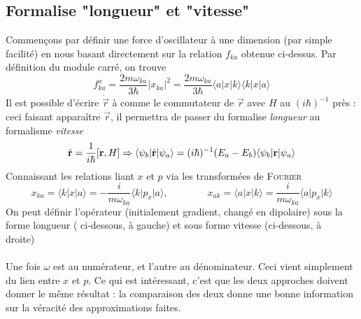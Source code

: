 \subsection{Formalise "longueur" et "vitesse"}
Commençons par définir une force d'oscillateur à une dimension (par simple facilité) en nous 
basant directement sur la relation $f_{ka}$ obtenue ci-dessus. Par définition du module carré, 
on trouve
\begin{equation}
f_{ka}^x =  \frac{2 m \omega_{ka}}{3 \hbar} \vert x_{ka} \vert^2 =
\frac{2m \omega_{ka}}{3 \hbar} \langle a \vert x \vert k \rangle 
\langle k \vert x \vert a \rangle
\end{equation}
Il est possible d'écrire $\dot{\vec{r}}$ à comme le commutateur de $\vec{r}$ avec $H$ au $(i\hbar)^{
-1}$ près : ceci faisant apparaître $\vec{r}$, il permettra de passer du formalise \textit{longueur}
au formalisme \textit{vitesse}
\begin{equation}
\dot{{\bf r}} = \frac{1}{i \hbar} [ {\bf r}, H] \Rightarrow
\langle \psi_b \vert \dot{{\bf r}} \vert \psi_a \rangle
= (i \hbar)^{-1} (E_a - E_b) \langle \psi_b \vert {\bf r} \vert
\psi_a \rangle
\end{equation}
Connaissant les relations liant $x$ et $p$ via les transformées de \textsc{Fourier}
\begin{equation}
x_{ka} = \langle k \vert x \vert a \rangle = - \frac{i}{m \omega_{ka}}
 \langle k \vert  p_x \vert a \rangle,\qquad\qquad
 x_{ak} = \langle a \vert x \vert k \rangle =  \frac{i}{m \omega_{ka}}
 \langle a \vert  p_x \vert k \rangle 
\end{equation}
On peut définir l'opérateur (initialement gradient, changé en dipolaire) sous la forme longueur (
ci-dessous, à gauche) et sous forme vitesse (ci-dessous, à droite)\ \\

\ \\

Une fois $\omega$ est au numérateur, et l'autre au dénominateur. Ceci vient simplement du lien entre
$x$ et $p$. Ce qui est intéressant, c'est que les deux approches doivent donner le même résultat :
la comparaison des deux donne une bonne information sur la véracité des approximations faites.

